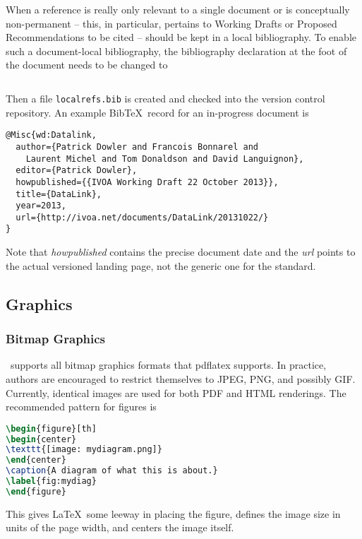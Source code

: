 \documentclass[11pt,a4paper]{ivoa}
\newcommand{\BibTeX}{BibTeX}
\begin{document}
When a reference is really only relevant to a single document or is
conceptually non-permanent -- this, in particular, pertains to Working
Drafts or Proposed Recommendations to be cited -- should be kept in a
local bibliography.  To enable such a document-local bibliography,
the bibliography declaration at the foot of the document needs to be
changed to

\begin{lstlisting}[language=tex]

\end{lstlisting}

Then a file \texttt{localrefs.bib} is created and checked into the
version control repository.  An example \BibTeX\ record for an
in-progress document is

\begin{lstlisting}
@Misc{wd:Datalink,
  author={Patrick Dowler and Francois Bonnarel and 
    Laurent Michel and Tom Donaldson and David Languignon},
  editor={Patrick Dowler},
  howpublished={{IVOA Working Draft 22 October 2013}},
  title={DataLink},
  year=2013,
  url={http://ivoa.net/documents/DataLink/20131022/}
}
\end{lstlisting}

Note that \emph{howpublished} contains the precise document date and the
\emph{url} points to the actual versioned landing page, not the generic
one for the standard.

\subsection{Graphics}

\subsubsection{Bitmap Graphics}

\ivoatex\ supports all bitmap graphics formats that pdflatex supports.
In practice, authors are encouraged to restrict themselves to JPEG, PNG,
and possibly GIF.  Currently, identical images are used for both PDF and
HTML renderings.  The recommended pattern for figures is
\begin{lstlisting}[language=tex]
\begin{figure}[th]
\begin{center}
\texttt{[image: mydiagram.png]}
\end{center}
\caption{A diagram of what this is about.}
\label{fig:mydiag}
\end{figure}
\end{lstlisting}
This gives \LaTeX\ some leeway in placing the figure, defines the image
size in units of the page width, and centers the image itself.
\end{document}
